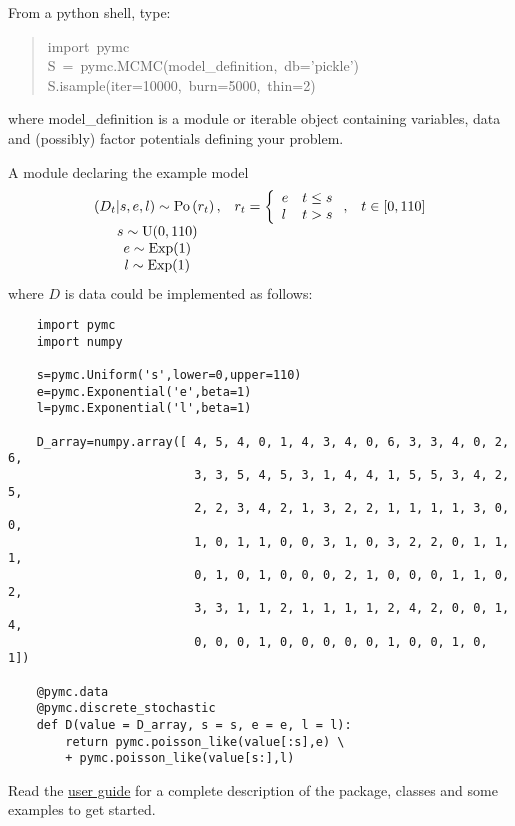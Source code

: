 From a python shell, type:
\begin{quote}{\ttfamily \raggedright \noindent
import~pymc~\\
S~=~pymc.MCMC(model{\_}definition,~db='pickle')~\\
S.isample(iter=10000,~burn=5000,~thin=2)
}\end{quote}
where model{\_}definition is a module or iterable object containing variables, data and (possibly) factor potentials defining your problem. 

A module declaring the example model
\begin{eqnarray*}
        \begin{array}{ccc}
            (D_t | s, e, l) \sim \textup{Po}\left(r_t\right), & r_t=\left\{\begin{array}{ll}
                e & t\le s\\ l & t>s
                \end{array}\right.,&t\in[0,110]\\
            s\sim \textup{U}(0,110)\\
            e\sim \textup{Exp}(1)\\
            l\sim \textup{Exp}(1)        
        \end{array}
        \label{disastermodel} 
\end{eqnarray*}
where $D$ is data could be implemented as follows:
\begin{verbatim}
    import pymc
    import numpy

    s=pymc.Uniform('s',lower=0,upper=110)
    e=pymc.Exponential('e',beta=1)
    l=pymc.Exponential('l',beta=1)

    D_array=numpy.array([ 4, 5, 4, 0, 1, 4, 3, 4, 0, 6, 3, 3, 4, 0, 2, 6,
                          3, 3, 5, 4, 5, 3, 1, 4, 4, 1, 5, 5, 3, 4, 2, 5,
                          2, 2, 3, 4, 2, 1, 3, 2, 2, 1, 1, 1, 1, 3, 0, 0,
                          1, 0, 1, 1, 0, 0, 3, 1, 0, 3, 2, 2, 0, 1, 1, 1,
                          0, 1, 0, 1, 0, 0, 0, 2, 1, 0, 0, 0, 1, 1, 0, 2,
                          3, 3, 1, 1, 2, 1, 1, 1, 1, 2, 4, 2, 0, 0, 1, 4,
                          0, 0, 0, 1, 0, 0, 0, 0, 0, 1, 0, 0, 1, 0, 1])

    @pymc.data
    @pymc.discrete_stochastic
    def D(value = D_array, s = s, e = e, l = l):
        return pymc.poisson_like(value[:s],e) \
        + pymc.poisson_like(value[s:],l)
\end{verbatim}
Read the \href{docs/pdf/new_interface.pdf}{user guide} for a
complete description of the package, classes and some examples to get started.


